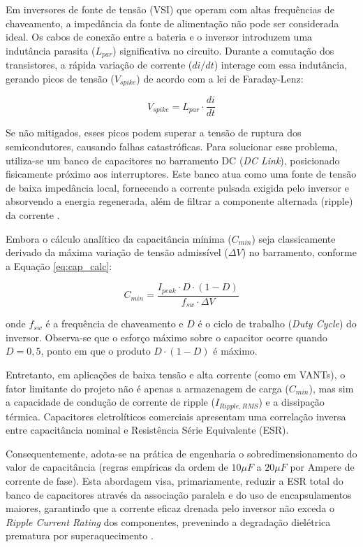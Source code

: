 Em inversores de fonte de tensão (VSI) que operam com altas frequências de chaveamento, a impedância da fonte de alimentação não pode ser considerada ideal. Os cabos de conexão entre a bateria e o inversor introduzem uma indutância parasita ($L_{par}$) significativa no circuito. Durante a comutação dos transistores, a rápida variação de corrente ($di/dt$) interage com essa indutância, gerando picos de tensão ($V_{spike}$) de acordo com a lei de Faraday-Lenz:

\begin{equation}
    V_{spike} = L_{par} \cdot \frac{di}{dt}
\end{equation}

Se não mitigados, esses picos podem superar a tensão de ruptura dos semicondutores, causando falhas catastróficas. Para solucionar esse problema, utiliza-se um banco de capacitores no barramento DC (\textit{DC Link}), posicionado fisicamente próximo aos interruptores. Este banco atua como uma fonte de tensão de baixa impedância local, fornecendo a corrente pulsada exigida pelo inversor e absorvendo a energia regenerada, além de filtrar a componente alternada (ripple) da corrente \cite{rashid2014power}.

Embora o cálculo analítico da capacitância mínima ($C_{min}$) seja classicamente derivado da máxima variação de tensão admissível ($\Delta V$) no barramento, conforme a Equação \ref{eq:cap_calc}:

\begin{equation}
    C_{min} = \frac{I_{peak} \cdot D \cdot (1-D)}{f_{sw} \cdot \Delta V}
    \label{eq:cap_calc}
\end{equation}

\noindent onde $f_{sw}$ é a frequência de chaveamento e $D$ é o ciclo de trabalho (\textit{Duty Cycle}) do inversor. Observa-se que o esforço máximo sobre o capacitor ocorre quando $D=0,5$, ponto em que o produto $D \cdot (1-D)$ é máximo.

Entretanto, em aplicações de baixa tensão e alta corrente (como em VANTs), o fator limitante do projeto não é apenas a armazenagem de carga ($C_{min}$), mas sim a capacidade de condução de corrente de ripple ($I_{Ripple,RMS}$) e a dissipação térmica. Capacitores eletrolíticos comerciais apresentam uma correlação inversa entre capacitância nominal e Resistência Série Equivalente (ESR).

Consequentemente, adota-se na prática de engenharia o sobredimensionamento do valor de capacitância (regras empíricas da ordem de $10\mu F$ a $20\mu F$ por Ampere de corrente de fase). Esta abordagem visa, primariamente, reduzir a ESR total do banco de capacitores através da associação paralela e do uso de encapsulamentos maiores, garantindo que a corrente eficaz drenada pelo inversor não exceda o \textit{Ripple Current Rating} dos componentes, prevenindo a degradação dielétrica prematura por superaquecimento \cite{rashid2014power}.

